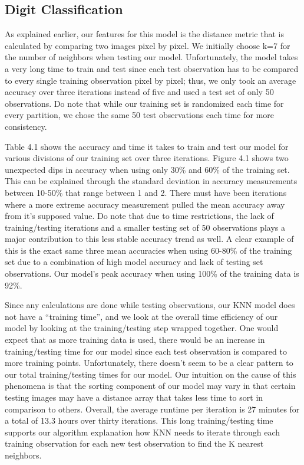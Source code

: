 \documentclass[10pt,parskip=half,
toc=sectionentrywithdots,
bibliography=totocnumbered,
captions=tableheading,numbers=noendperiod]{scrartcl}
\begin{document}
\hypertarget{digit-classification}{%
\subsection{Digit Classification}\label{digit-classification}}

As explained earlier, our features for this model is the distance metric
that is calculated by comparing two images pixel by pixel. We initially
choose k=7 for the number of neighbors when testing our model.
Unfortunately, the model takes a very long time to train and test since
each test observation has to be compared to every single training
observation pixel by pixel; thus, we only took an average accuracy over
three iterations instead of five and used a test set of only 50
observations. Do note that while our training set is randomized each
time for every partition, we chose the same 50 test observations each
time for more consistency.

Table 4.1 shows the accuracy and time it takes to train and test our
model for various divisions of our training set over three iterations.
Figure 4.1 shows two unexpected dips in accuracy when using only 30\%
and 60\% of the training set. This can be explained through the standard
deviation in accuracy measurements between 10-50\% that range between 1
and 2. There must have been iterations where a more extreme accuracy
measurement pulled the mean accuracy away from it's supposed value. Do
note that due to time restrictions, the lack of training/testing
iterations and a smaller testing set of 50 observations plays a major
contribution to this less stable accuracy trend as well. A clear example
of this is the exact same three mean accuracies when using 60-80\% of
the training set due to a combination of high model accuracy and lack of
testing set observations. Our model's peak accuracy when using 100\% of
the training data is 92\%.

Since any calculations are done while testing observations, our KNN
model does not have a ``training time'', and we look at the overall time
efficiency of our model by looking at the training/testing step wrapped
together. One would expect that as more training data is used, there
would be an increase in training/testing time for our model since each
test observation is compared to more training points. Unfortunately,
there doesn't seem to be a clear pattern to our total training/testing
times for our model. Our intuition on the cause of this phenomena is
that the sorting component of our model may vary in that certain testing
images may have a distance array that takes less time to sort in
comparison to others. Overall, the average runtime per iteration is 27
minutes for a total of 13.3 hours over thirty iterations. This long
training/testing time supports our algorithm explanation how KNN needs
to iterate through each training observation for each new test
observation to find the K nearest neighbors.
\end{document}
